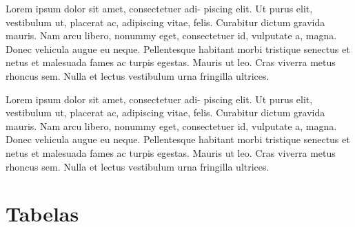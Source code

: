 \begin{question}[type={exam}]{2}
Lorem ipsum dolor sit amet, consectetuer adi-
piscing elit. Ut purus elit, vestibulum ut, placerat ac, adipiscing vitae,
felis. Curabitur dictum gravida mauris. Nam arcu libero, nonummy
eget, consectetuer id, vulputate a, magna. Donec vehicula augue
eu neque. Pellentesque habitant morbi tristique senectus et netus
et malesuada fames ac turpis egestas. Mauris ut leo. Cras viverra
metus rhoncus sem. Nulla et lectus vestibulum urna fringilla ultrices.
\end{question}

\begin{question}[type={exam}]{2}
Lorem ipsum dolor sit amet, consectetuer adi-
piscing elit. Ut purus elit, vestibulum ut, placerat ac, adipiscing vitae,
felis. Curabitur dictum gravida mauris. Nam arcu libero, nonummy
eget, consectetuer id, vulputate a, magna. Donec vehicula augue
eu neque. Pellentesque habitant morbi tristique senectus et netus
et malesuada fames ac turpis egestas. Mauris ut leo. Cras viverra
metus rhoncus sem. Nulla et lectus vestibulum urna fringilla ultrices.
\end{question}
\vfill
\pagebreak
\section{Tabelas}

